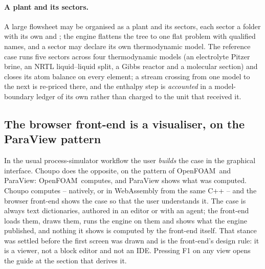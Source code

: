 \documentclass[11pt,a4paper]{article}
\newcommand{\code}[1]{\texttt{\detokenize{#1}}}
\newcommand{\OF}{OpenFOAM}
\begin{document}
\paragraph{A plant and its sectors.}  A large flowsheet may be organised as
a plant and its sectors, each sector a folder with its own \code{system/}
and \code{constant/}; the engine flattens the tree to one flat problem with
qualified names, and a sector may declare its own thermodynamic model.  The
reference case runs five sectors across four thermodynamic models (an
electrolyte Pitzer brine, an NRTL liquid--liquid split, a Gibbs reactor and
a molecular section) and closes its atom balance on every element; a
stream crossing from one model to the next is re-priced there, and the
enthalpy step is \emph{accounted} in a model-boundary ledger of its own
rather than charged to the unit that received it.

\subsection{The browser front-end is a visualiser, on the ParaView pattern}
\label{sec:gui}

In the usual process-simulator workflow the user \emph{builds} the case in
the graphical interface.  Choupo does the opposite, on the pattern of
\OF\ and ParaView: \OF\ computes, and ParaView shows what was computed.
Choupo computes -- natively, or in WebAssembly from the same C++ -- and the
browser front-end shows the case so that the user understands it.  The
case is always text dictionaries, authored in an editor or with an agent;
the front-end loads them, draws them, runs the engine on them and shows
what the engine published, and nothing it shows is computed by the
front-end itself.  That stance was settled before the first screen was
drawn and is the front-end's design rule: it is a viewer, not a block
editor and not an IDE.  Pressing F1 on any view opens the guide at the
section that derives it.
\end{document}
